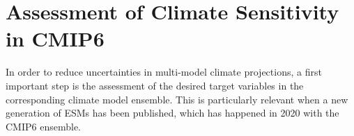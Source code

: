 


\chapter{Assessment of Climate Sensitivity in \acs{CMIP}6}
\label{ch:04:assessment_climate_metrics}

In order to reduce uncertainties in multi-model climate projections, a first
important step is the assessment of the desired target variables in the
corresponding climate model ensemble. This is particularly relevant when a new
generation of \acp{ESM} has been published, which has happened in 2020 with the
\acs{CMIP}6 ensemble.
